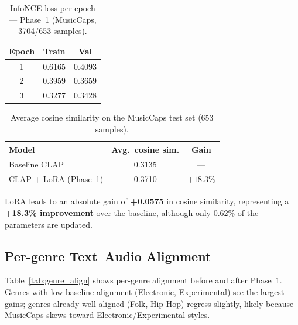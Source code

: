 \documentclass[11pt]{article}
\begin{document}
\begin{table}[h]
\centering

\label{tab:training}
\begin{tabular}{ccc}
\toprule
\textbf{Epoch} & \textbf{Train} & \textbf{Val} \\
\midrule
1 & 0.6165 & 0.4093 \\
2 & 0.3959 & 0.3659 \\
3 & 0.3277 & 0.3428 \\
\bottomrule
\end{tabular}
\caption{InfoNCE loss per epoch — Phase~1 (MusicCaps, 3704/653 samples).}
\end{table}

\begin{table}[h]
\centering
\label{tab:cosine}
\begin{tabular}{lcc}
\toprule
\textbf{Model} & \textbf{Avg.\ cosine sim.} & \textbf{Gain} \\
\midrule
Baseline CLAP         & 0.3135 & --- \\
CLAP + LoRA (Phase~1) & 0.3710 & $+18.3\%$ \\
\bottomrule
\end{tabular}
\caption{Average cosine similarity on the MusicCaps test set (653 samples).}
\end{table}

LoRA leads to an absolute gain of \textbf{+0.0575} in cosine similarity, representing a \textbf{+18.3\% improvement} over the baseline, although only 0.62\%
of the parameters are updated.

\subsection{Per-genre Text--Audio Alignment}

Table~\ref{tab:genre_align} shows per-genre alignment before and after Phase~1.
Genres with low baseline alignment (Electronic, Experimental) see the largest gains;
genres already well-aligned (Folk, Hip-Hop) regress slightly, likely because
MusicCaps skews toward Electronic/Experimental styles.
\end{document}
